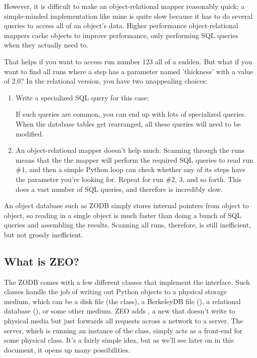 However, it is difficult to make an object-relational mapper
reasonably quick; a simple-minded implementation like mine is quite
slow because it has to do several queries to access all of an object's
data.  Higher performance object-relational mappers cache objects to
improve performance, only performing SQL queries when they actually
need to.

That helps if you want to access run number 123 all of a sudden.  But
what if you want to find all runs where a step has a parameter named
'thickness' with a value of 2.0?  In the relational version, you have
two unappealing choices:

\begin{enumerate}
 \item Write a specialized SQL query for this case: 
  
  If such queries are common, you can end up with lots of specialized
  queries.  When the database tables get rearranged, all these queries
  will need to be modified.

 \item An object-relational mapper doesn't help much.  Scanning
  through the runs means that the the mapper will perform the required
  SQL queries to read run \#1, and then a simple Python loop can check
  whether any of its steps have the parameter you're looking for.
  Repeat for run \#2, 3, and so forth.  This does a vast
  number of SQL queries, and therefore is incredibly slow.

\end{enumerate}

An object database such as ZODB simply stores internal pointers from
object to object, so reading in a single object is much faster than
doing a bunch of SQL queries and assembling the results. Scanning all
runs, therefore, is still inefficient, but not grossly inefficient.

\subsection{What is ZEO?}

The ZODB comes with a few different classes that implement the
 interface.  Such classes handle the job of
writing out Python objects to a physical storage medium, which can be
a disk file (the  class), a BerkeleyDB file
(), a relational database
(), or some other medium.  ZEO adds
, a new  that doesn't write to
physical media but just forwards all requests across a network to a
server.  The server, which is running an instance of the
 class, simply acts as a front-end for some
physical  class.  It's a fairly simple idea, but as
we'll see later on in this document, it opens up many possibilities.

